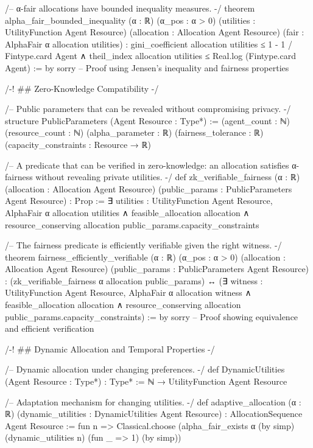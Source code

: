 /--
α-fair allocations have bounded inequality measures.
-/
theorem alpha_fair_bounded_inequality (α : ℝ) (α_pos : α > 0)
    (utilities : UtilityFunction Agent Resource)
    (allocation : Allocation Agent Resource)
    (fair : AlphaFair α allocation utilities) :
    gini_coefficient allocation utilities ≤ 1 - 1 / Fintype.card Agent ∧
    theil_index allocation utilities ≤ Real.log (Fintype.card Agent) := by
  sorry -- Proof using Jensen's inequality and fairness properties

/-! ## Zero-Knowledge Compatibility -/

/--
Public parameters that can be revealed without compromising privacy.
-/
structure PublicParameters (Agent Resource : Type*) :=
  (agent_count : ℕ)
  (resource_count : ℕ)  
  (alpha_parameter : ℝ)
  (fairness_tolerance : ℝ)
  (capacity_constraints : Resource → ℝ)

/--
A predicate that can be verified in zero-knowledge: an allocation satisfies
α-fairness without revealing private utilities.
-/
def zk_verifiable_fairness (α : ℝ) (allocation : Allocation Agent Resource)
    (public_params : PublicParameters Agent Resource) : Prop :=
  ∃ utilities : UtilityFunction Agent Resource,
    AlphaFair α allocation utilities ∧
    feasible_allocation allocation ∧
    resource_conserving allocation public_params.capacity_constraints

/--
The fairness predicate is efficiently verifiable given the right witness.
-/
theorem fairness_efficiently_verifiable (α : ℝ) (α_pos : α > 0)
    (allocation : Allocation Agent Resource)
    (public_params : PublicParameters Agent Resource) :
    (zk_verifiable_fairness α allocation public_params) ↔
    (∃ witness : UtilityFunction Agent Resource,
      AlphaFair α allocation witness ∧
      feasible_allocation allocation ∧
      resource_conserving allocation public_params.capacity_constraints) := by
  sorry -- Proof showing equivalence and efficient verification

/-! ## Dynamic Allocation and Temporal Properties -/

/--
Dynamic allocation under changing preferences.
-/
def DynamicUtilities (Agent Resource : Type*) : Type* := 
  ℕ → UtilityFunction Agent Resource

/--
Adaptation mechanism for changing utilities.
-/
def adaptive_allocation (α : ℝ) (dynamic_utilities : DynamicUtilities Agent Resource) :
    AllocationSequence Agent Resource :=
  fun n => Classical.choose (alpha_fair_exists α (by simp) (dynamic_utilities n) 
                           (fun _ => 1) (by simp))

